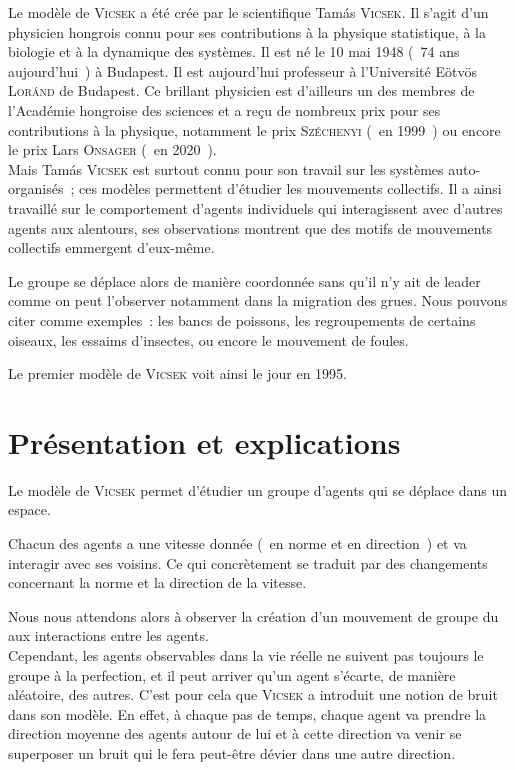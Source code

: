 \documentclass[french, a4paper, 12pt, openany]{report}
\begin{document}
	Le modèle de \textsc{\textsc{Vicsek}} a été crée par le scientifique Tamás \textsc{\textsc{Vicsek}}. Il s'agit d'un physicien hongrois connu pour ses contributions à la physique statistique, à la biologie et à la dynamique des systèmes. Il est né le 10 mai 1948 (~74 ans aujourd'hui~) à Budapest. Il est aujourd'hui professeur à l'Université Eötvös \textsc{Loránd} de Budapest. Ce brillant physicien est d'ailleurs un des membres de l'Académie hongroise des sciences et a reçu de nombreux prix pour ses contributions à la physique, notamment le prix \textsc{Széchenyi} (~en 1999~) ou encore le prix Lars \textsc{Onsager} (~en 2020~). \\

	Mais Tamás \textsc{\textsc{Vicsek}} est surtout connu pour son travail sur les systèmes auto-organisés~; ces modèles permettent d'étudier les mouvements collectifs. Il a ainsi travaillé sur le comportement d'agents individuels qui interagissent avec d'autres agents aux alentours, ses observations montrent que des motifs de mouvements collectifs emmergent d'eux-même.
	
	Le groupe se déplace alors de manière coordonnée sans qu'il n'y ait de leader comme on peut l'observer notamment dans la migration des grues. Nous pouvons citer comme exemples~: les bancs de poissons, les regroupements de certains oiseaux, les essaims d'insectes, ou encore le mouvement de foules.

	 Le premier modèle de \textsc{\textsc{Vicsek}} voit ainsi le jour en 1995.\\
	 
	
\chapter{Présentation et explications}	

	Le modèle de \textsc{\textsc{Vicsek}} permet d'étudier un groupe d'agents qui se déplace dans un espace.
	
	Chacun des agents a une vitesse donnée (~en norme et en direction~) et va interagir avec ses voisins. Ce qui concrètement se traduit par des changements concernant la norme et la direction de la vitesse.
	
	Nous nous attendons alors à observer la création d'un mouvement de groupe du aux interactions entre les agents. \\
	
	Cependant, les agents observables dans la vie réelle ne suivent pas toujours le groupe à la perfection, et il peut arriver qu'un agent s'écarte, de manière aléatoire, des autres. C'est pour cela que \textsc{\textsc{Vicsek}} a introduit une notion de bruit dans son modèle. En effet, à chaque pas de temps, chaque agent va prendre la direction moyenne des agents autour de lui et à cette direction va venir se superposer un bruit qui le fera peut-être dévier dans une autre direction.
	
\end{document}
